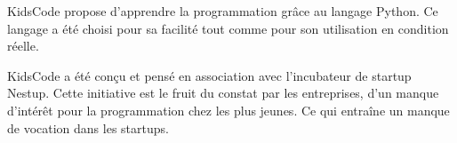 KidsCode propose d'apprendre la programmation grâce au langage Python. Ce langage a été choisi pour sa facilité tout comme pour son utilisation en condition réelle.

KidsCode a été conçu et pensé en association avec l'incubateur de startup Nestup. Cette initiative est le fruit du constat par les entreprises, d'un manque d'intérêt pour la programmation chez les plus jeunes. Ce qui entraîne un manque de vocation dans les startups.
